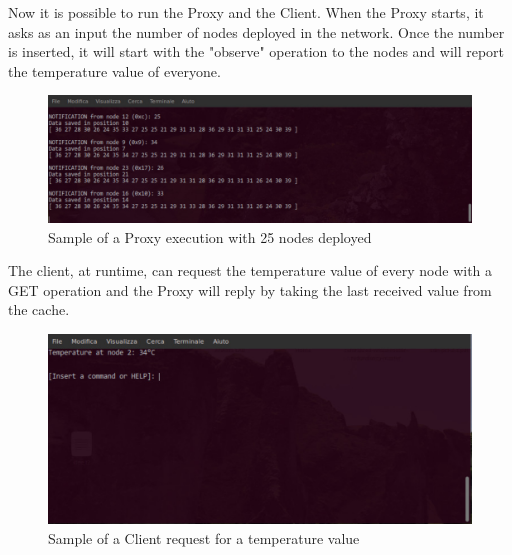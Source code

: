 \documentclass[10pt,english, openany]{book}
\begin{document}
Now it is possible to run the Proxy and the Client.
When the Proxy starts, it asks as an input the number of nodes deployed in the network. Once the number is inserted, it will start with the "observe" operation to the nodes and will report the temperature value of everyone.

\begin{figure}[H]
\centering
\includegraphics[scale=0.4]{proxy.png}
\caption{Sample of a Proxy execution with 25 nodes deployed}
\end{figure}

The client, at runtime, can request the temperature value of every node with a GET operation and the Proxy will reply by taking the last received value from the cache.

\begin{figure}[H]
\centering
\includegraphics[scale=0.4]{client.png}
\caption{Sample of a Client request for a temperature value}
\end{figure}
\end{document}
